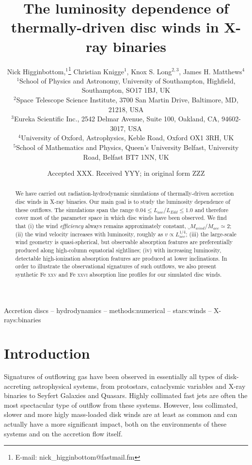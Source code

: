 \documentclass[a4paper,fleqn,usenatbib]{mnras}
\title[The luminosity dependence of disc winds in XRBs]{The luminosity dependence of thermally-driven disc winds in X-ray binaries}
\author[N. Higginbottom et. al]
{Nick Higginbottom,$^{1}$\thanks{E-mail: nick\_higginbottom@fastmail.fm}
Christian Knigge$^{1}$, Knox S. Long$^{2,3}$, 
James H. Matthews$^{4}$ \newauthor{and
Edward J. Parkinson$^{1}$.}
\\
$^{1}$School of Physics and Astronomy, University of Southampton, Highfield, Southampton, SO17 1BJ, UK\\
$^{2}$Space Telescope Science Institute, 3700 San Martin Drive, Baltimore, MD, 21218, USA\\
$^{3}$Eureka Scientific Inc., 2542 Delmar Avenue, Suite 100, Oakland, CA, 94602-3017, USA\\
$^{4}$University of Oxford, Astrophysics, Keble Road, Oxford OX1 3RH, UK\\
$^{5}$School of Mathematics and Physics, Queen's University Belfast, University Road, Belfast 
BT7 1NN, UK\\
}
\date{Accepted XXX. Received YYY; in original form ZZZ}
\begin{document}
\label{firstpage}
\pagerange{\pageref{firstpage}--\pageref{lastpage}}
\maketitle

\begin{abstract}

  We have carried out radiation-hydrodynamic simulations of
  thermally-driven accretion disc winds in X-ray binaries. Our main
  goal is to study the luminosity dependence of these outflows. The 
  simulations span the range 
  $0.04 \leq L_{acc}/L_{Edd} \leq 1.0$ and therefore cover most of the parameter
  space in which disc winds have been observed. We
  find that (i) the wind {\em
  efficiency} always remains approximately
  constant, $\dot_{M}_{wind}/\dot{M}_{acc} \simeq
  2$; (ii) the wind velocity 
  increases with luminosity, roughly as $v \propto L_{acc}^{1/4}$;
  (iii) the large-scale wind geometry is quasi-spherical, but 
  observable absorption features are preferentially produced along
  high-column equatorial sightlines; (iv) with increasing luminosity,
  detectable high-ionization absorption features are produced at lower 
  inclinations. In order to illustrate the observational signatures of such
  outflows, we also present synthetic Fe \textsc{xxv}
  and Fe \textsc{xxvi} absorption line profiles for our simulated disc winds.


\end{abstract}

\begin{keywords}
Accretion discs -- hydrodynamics -- methods:numerical -- stars:winds -- X-rays:binaries
\end{keywords}



\section{Introduction}
Signatures of outflowing gas have been observed in essentially all
types of disk-accreting astrophysical systems, from protostars,
cataclysmic variables and X-ray binaries to Seyfert Galaxies and
Quasars. Highly collimated fast jets are often the most spectacular
type of outflow from these systems. However, less collimated, slower
and more higly mass-loaded disk winds are at least as common and can 
actually have a more significant impact, both on the environments of
these systems and on the accretion flow itself. 
 
\end{document}
